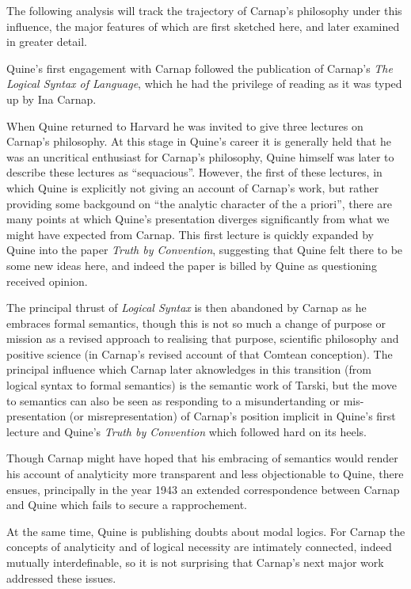 The following analysis will track the trajectory of Carnap's
philosophy under this influence, the major features of which
are first sketched here, and later examined in greater detail.

Quine's first engagement with Carnap followed the publication
of Carnap's {\it The Logical Syntax of Language}\cite{carnap37},
which he had the privilege of reading as it was typed up by
Ina Carnap.

When Quine returned to Harvard he was invited to give three
lectures on Carnap's philosophy.  
At this stage in Quine's career it is generally held that
he was an uncritical enthusiast for Carnap's philosophy,
Quine himself was later to describe these lectures as ``sequacious''.
However, the first of these lectures, in which Quine is explicitly
not giving an account of Carnap's work, but rather providing some
backgound on ``the analytic character of the a priori'', there
are many points at which Quine's presentation diverges significantly
from what we might have expected from Carnap.
This first lecture is quickly expanded by Quine into the paper
{\it Truth by Convention}\cite{quine36}, suggesting that Quine
felt there to be some new ideas here, and indeed the paper is
billed by Quine as questioning received opinion.

The principal thrust of {\it Logical Syntax} is then abandoned by
Carnap as he embraces formal semantics, though this is not so
much a change of purpose or mission as a revised approach to realising
that purpose, scientific philosophy and positive science
(in Carnap's revised account of that Comtean conception).
The principal influence which Carnap later aknowledges in this
transition (from logical syntax to formal semantics) is the
semantic work of Tarski, but the move to semantics can also
be seen as responding to a misundertanding or mis-presentation
(or misrepresentation) of Carnap's position implicit in Quine's
first lecture and Quine's {\it Truth by Convention} \cite{quine36}
which followed hard on its heels.

Though Carnap might have hoped that his embracing of semantics
would render his account of analyticity more transparent and less
objectionable to Quine, there ensues, principally in the year 1943
an extended correspondence between Carnap and Quine \cite{carnap90}
which fails to secure a rapprochement.

At the same time, Quine is publishing doubts about modal logics.
For Carnap the concepts of analyticity and of logical necessity
are intimately connected, indeed mutually interdefinable, so
it is not surprising that Carnap's next major work addressed these
issues.

